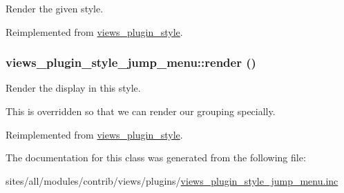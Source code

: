 Render the given style. 

Reimplemented from \hyperlink{classviews__plugin__style_fe3d437ff4398315b15c4e60975dbb1c}{views\_\-plugin\_\-style}.\hypertarget{classviews__plugin__style__jump__menu_ebc54d57acea582a05435beccaa26fef}{
\subsubsection[{render}]{\setlength{\rightskip}{0pt plus 5cm}views\_\-plugin\_\-style\_\-jump\_\-menu::render ()}}
\label{classviews__plugin__style__jump__menu_ebc54d57acea582a05435beccaa26fef}


Render the display in this style.

This is overridden so that we can render our grouping specially. 

Reimplemented from \hyperlink{classviews__plugin__style_a52b618e91b11a7d10ad1feadbc891f1}{views\_\-plugin\_\-style}.

The documentation for this class was generated from the following file:\begin{CompactItemize}
\item 
sites/all/modules/contrib/views/plugins/\hyperlink{views__plugin__style__jump__menu_8inc}{views\_\-plugin\_\-style\_\-jump\_\-menu.inc}\end{CompactItemize}
